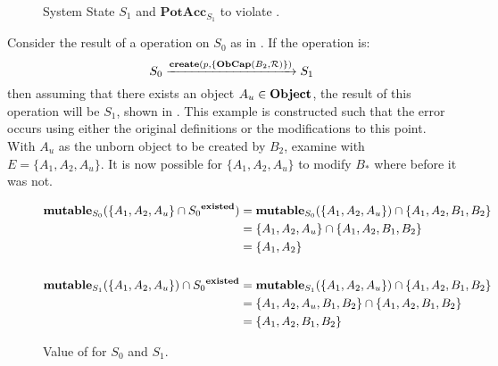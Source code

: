\begin{figure}
\begin{center}
  \end{center}
  \caption{\label{fig:SW:authred:S1}System State \(S_1\) and \(\mathbf{PotAcc}_{S_1}\) to violate \thmauthred{}.}
\end{figure}

\pagebreak[4]

Consider the result of a \create{} operation on \(S_0\) as in .
If the operation is:
\[\singleop{S_0}{S_1}{\createapp{p}{\{\obcapapp{\ensuremath{B_2}}{\rightsset}\}}}\] 
then assuming that there exists an object \(A_u \in \objectset \), the result of this \create{} operation will be \(S_1\), shown in .
This example is constructed such that the error occurs using either the original \TMSW{} definitions or the modifications to this point.
With \(A_u\) as the unborn object to be created by \ensuremath{B_2}, examine \thmauthred{} with \(E = \{A_1, A_2, A_u\}\).
It is now possible for \(\{A_1, A_2, A_u\}\) to modify \(B_*\) where before it was not.

\begin{figure}
\begin{align*}
\mutableapp{S_0}{\{A_1,A_2,A_u\} \cap \existedset{S_0}} &= \mutableapp{S_0}{\{A_1,A_2,A_u\}} \cap \{A_1,A_2,B_1,B_2\} \\
&= \{A_1,A_2,A_u\} \cap \{A_1,A_2,B_1,B_2\} \\
&= \{A_1,A_2\} \\
\\
\mutableapp{S_1}{\{A_1,A_2,A_u\}} \cap \existedset{S_0} &= \mutableapp{S_1}{\{A_1,A_2,A_u\}} \cap \{A_1,A_2,B_1,B_2\} \\
&= \{A_1,A_2,A_u,B_1,B_2\} \cap \{A_1,A_2,B_1,B_2\} \\
&= \{A_1,A_2,B_1,B_2\}
\end{align*}
\caption{Value of \mutable{} for \(S_0\) and \(S_1\).}
\end{figure}

